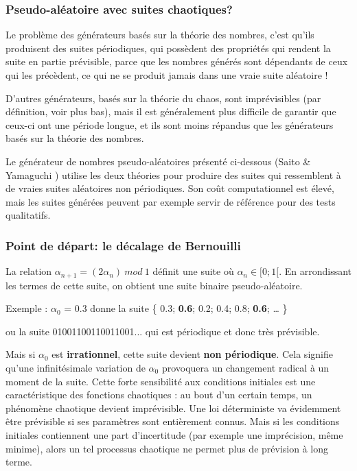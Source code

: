 \documentclass{scrartcl}
\begin{document}
\subsubsection{Pseudo-aléatoire avec suites chaotiques?}
Le problème des générateurs basés sur la théorie des nombres, c’est qu’ils
produisent des suites périodiques, qui possèdent des propriétés qui rendent la
suite en partie prévisible, parce que les nombres générés sont dépendants de
ceux qui les précèdent, ce qui ne se produit jamais dans une vraie suite
aléatoire ! \par
D’autres générateurs, basés sur la théorie du chaos, sont imprévisibles (par
définition, voir plus bas), mais il est généralement plus difficile de garantir
que ceux-ci ont une période longue, et ils sont moins répandus que les
générateurs basés sur la théorie des nombres. \par
Le générateur de nombres pseudo-aléatoires présenté ci-dessous (Saito \&
Yamaguchi \cite{SY}) utilise les deux théories pour produire des suites qui
ressemblent à de vraies suites aléatoires non périodiques. Son coût
computationnel est élevé, mais les suites générées peuvent par exemple servir de
référence pour des tests qualitatifs.

\subsubsection{Point de départ: le décalage de Bernouilli}
La relation $\alpha_{n+1}=(2\alpha_n)\ mod\ 1$ définit une suite où
$\alpha_n \in [0;1[$. En arrondissant les termes de cette suite, on obtient une
suite binaire pseudo-aléatoire. \par
Exemple : $\alpha_0$ = 0.3 donne la suite \{ 0.3; \textbf{0.6}; 0.2; 0.4; 0.8;
\textbf{0.6}; … \} \par
ou la suite 01001100110011001... qui est périodique et donc très
prévisible. \par
Mais si $\alpha_0$ est \textbf{irrationnel}, cette suite devient \textbf{non
  périodique}. Cela signifie qu’une infinitésimale variation de $\alpha_0$
provoquera un changement radical à un moment de la suite. Cette forte
sensibilité aux conditions initiales est une caractéristique des fonctions
chaotiques : au bout d'un certain temps, un phénomène chaotique devient
imprévisible.  Une loi déterministe va évidemment être prévisible si ses
paramètres sont entièrement connus. Mais si les conditions initiales contiennent
une part d’incertitude (par exemple une imprécision, même minime), alors un tel
processus chaotique ne permet plus de prévision à long terme.
\end{document}
